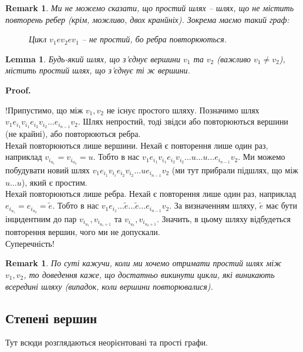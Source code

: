 \documentclass[a4paper, 14pt]{extarticle}
\makeatletter
\theoremstyle{theoremdd}
\theoremstyle{theoremdd}
\theoremstyle{theoremdd}
\theoremstyle{theoremdd}
\theoremstyle{theoremdd}
\theoremstyle{theoremdd}
\theoremstyle{theoremdd}
\theoremstyle{theoremdd}
\theoremstyle{theoremdd}
\theoremstyle{theoremdd}
\theoremstyle{theoremdd}
\newtheorem{remark}[theorem]{Remark}
\theoremstyle{theoremdd}
\theoremstyle{theoremdd}
\newtheorem{lemma}[theorem]{Lemma}
\theoremstyle{theoremdd}
\theoremstyle{theoremdd}
\renewenvironment{proof}[1][Proof.\\]{\par
\pushQED{\hfill \qed}%
\normalfont \topsep6\p@\@plus6\p@\relax
\trivlist
\item\relax
{\bfseries
#1\@addpunct{.}}\hspace\labelsep\ignorespaces
}{%
\popQED\endtrivlist\@endpefalse
}
\makeatother
\begin{document}
\begin{remark}
Ми не можемо сказати, що простий шлях -- шлях, що не містить повторень ребер (крім, можливо, двох кранйніх). Зокрема маємо такий граф:
\begin{figure}[H]
\centering
{}
\caption*{Цикл $v_1ev_2ev_1$ -- не простий, бо ребра повторюються.}
\end{figure}
\end{remark}

\begin{lemma}
Будь-який шлях, що з'єднує вершини $v_1$ та $v_2$ (важливо $v_1 \neq v_2$), містить простий шлях, що з'єднує ті ж вершини.
\end{lemma}

\begin{proof}
!Припустимо, що між $v_1,v_2$ не існує простого шляху. Позначимо шлях $v_1e_{i_1}v_{i_1}e_{i_2}v_{i_2} \dots e_{i_{n-1}}v_2$. Шлях непростий, тоді звідси або повторюються вершини (не крайні), або повторюються ребра.\\
Нехай повторюються лише вершини. Нехай є повторення лише один раз, наприклад $v_{i_{u_1}} = v_{i_{u_2}} = u$. Тобто в нас $v_1e_{i_1}v_{i_1}e_{i_2}v_{i_2} \dots u \dots u \dots  e_{i_{n-1}}v_2$. Ми можемо побудувати новий шлях $v_1e_{i_1}v_{i_i}e_{i_2}v_{i_2} \dots u e_{i_{n-1}}v_2$ (ми тут прибрали підшлях, що між $u \dots u$), який є простим.\\
Нехай повторюються лише ребра. Нехай є повторення лише один раз, наприклад $e_{i_{u_1}} = e_{i_{u_2}} = \tilde{e}$. Тобто в нас $v_1 e_{i_1} \dots \tilde{e} \dots \tilde{e} \dots e_{i_{n-1}}v_2$. За визначенням шляху, $\tilde{e}$ має бути інцидентним до пар $v_{i_{u_1}}, v_{i_{u_1+1}}$ та $v_{i_{u_2}}, v_{i_{u_2+1}}$. Значить, в цьому шляху відбудеться повторення вершин, чого ми не допускали.\\
Суперечність!
\end{proof}

\begin{remark}
По суті кажучи, коли ми хочемо отримати простий шлях між $v_1,v_2$, то доведення каже, що достатньо викинути цикли, які виникають всередині шляху (випадок, коли вершини повторювалися).
\end{remark}

\subsection{Степені вершин}
Тут всюди розглядаються неорієнтовані та прості графи.
\end{document}
